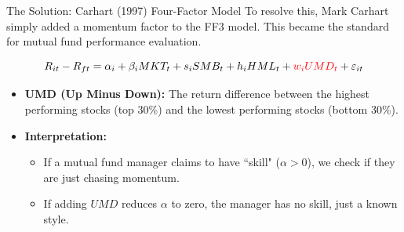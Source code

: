 \documentclass{beamer}
\begin{document}
\begin{frame}{The Solution: Carhart (1997) Four-Factor Model}
	To resolve this, Mark Carhart simply added a momentum factor to the FF3 model. This became the standard for mutual fund performance evaluation.
	
	\begin{equation}
		R_{it} - R_{ft} = \alpha_i + \beta_i MKT_t + s_i SMB_t + h_i HML_t + \textcolor{red}{w_i UMD_t} + \varepsilon_{it}
	\end{equation}
	
	\begin{itemize}
		\item \textbf{UMD (Up Minus Down):} The return difference between the highest performing stocks (top 30\%) and the lowest performing stocks (bottom 30\%).
		\item \textbf{Interpretation:}
		\begin{itemize}
			\item If a mutual fund manager claims to have ``skill" ($\alpha > 0$), we check if they are just chasing momentum.
			\item If adding $UMD$ reduces $\alpha$ to zero, the manager has no skill, just a known style.
		\end{itemize}
	\end{itemize}
\end{frame}
\end{document}
